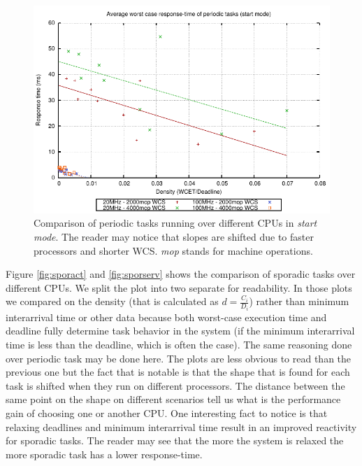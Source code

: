 \documentclass[10pt,a4paper]{report}
\begin{document}
\begin{figure}[tb]
\centering
\includegraphics[width=\textwidth]{plots/sust_periodic}
\caption{
    Comparison of periodic tasks running over different CPUs in \emph{start 
    mode}. The reader may notice that slopes are shifted due to faster 
    processors and shorter WCS. \emph{mop} stands for machine operations. 
}
\label{fig:periodic}
\end{figure}

Figure \ref{fig:sporact} and 
\ref{fig:sporserv} shows the comparison of sporadic tasks over different CPUs.
We split the plot into two separate for readability. 
In those plots we compared on the density (that is calculated as $d=\frac{C_i}{D_i}$) 
rather than minimum interarrival time or other data because both worst-case 
execution time and deadline fully determine task behavior in the system (if the 
minimum interarrival time is less than the deadline, which is often the case). The 
same reasoning done over periodic task may be done here. The plots are less 
obvious to read than the previous one but the fact that is notable is that 
the shape that is found for each task is shifted when they run on different 
processors. The distance between the same point on the shape on different 
scenarios tell us what is the performance gain of choosing one or another CPU. 
One interesting fact to notice is that relaxing deadlines and minimum 
interarrival time result in an improved reactivity for sporadic tasks. The 
reader may see that the more the system is relaxed the more sporadic task has a 
lower response-time. 
\end{document}
